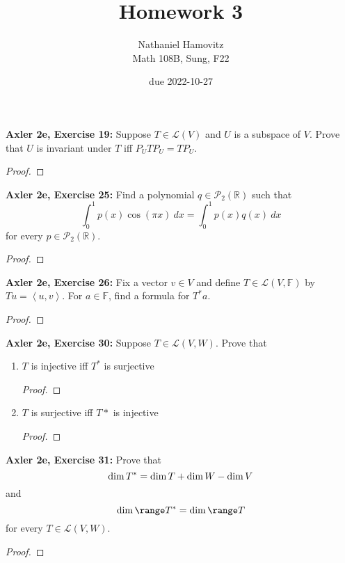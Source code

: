 \documentclass{article}
\newcommand{\R}{\mathbb{R}}
\newcommand{\F}{\mathbb{F}}
\newcommand{\iprod}[2]{\left\langle #1, #2 \right\rangle}
\begin{document}
\renewcommand{\labelenumi}{(\alph{enumi})}


\title{Homework 3} %
\author{Nathaniel Hamovitz\\Math 108B, Sung, F22}
\date{due 2022-10-27}

\maketitle


\textbf{Axler 2e, Exercise 19: }
Suppose $T \in \mathcal{L}(V)$ and $U$ is a subspace of $V$. Prove that $U$ is invariant under $T$ iff $P_U T P_U = T P_U$.

\begin{proof}
    
\end{proof}


\newpage %


\textbf{Axler 2e, Exercise 25: }
Find a polynomial $q \in \mathcal{P}_2(\R)$ such that
$$\int_0^1 p(x) \cos(\pi x) \: dx = \int_0^1 p(x) q(x) \: dx$$
for every $p \in \mathcal{P}_2(\R)$.

\begin{proof}
    
\end{proof}


\newpage %


\textbf{Axler 2e, Exercise 26: }
Fix a vector $v \in V$ and define $T \in \mathcal{L}(V, \F)$ by $Tu = \iprod{u}{v}$. For $a \in \F$, find a formula for $T^* a$.

\begin{proof}
    
\end{proof}


\newpage %


\textbf{Axler 2e, Exercise 30: }
Suppose $T \in \mathcal{L}(V, W)$. Prove that

\begin{enumerate}
    \item 
    $T$ is injective iff $T^*$ is surjective
    \begin{proof}
        
    \end{proof}


    \item 
    $T$ is surjective iff $T*$ is injective
    \begin{proof}
        
    \end{proof}
\end{enumerate}


\newpage %


\textbf{Axler 2e, Exercise 31: }
Prove that
$$\dim \null T^* = \dim \null T + \dim W - \dim V$$
and
$$\dim \range T^* = \dim \range T$$
for every $T \in \mathcal{L}(V, W)$.
\begin{proof}
    
\end{proof}
\end{document}
